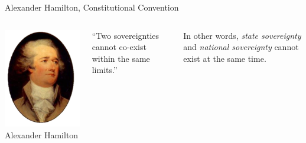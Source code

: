 \begin{frame}{Alexander Hamilton, Constitutional Convention}
    \begin{columns}[onlytextwidth]
            \centering
            \includegraphics[height=0.75\textheight]{img/hamilton.png} \\
            Alexander Hamilton \\

            \begin{block}{}
                ``Two sovereignties cannot co-exist within the same limits.''
            \end{block}
            \pause
            \vspace{15pt}
            In other words, \emph{state sovereignty} and \emph{national sovereignty} cannot exist at the same time.
    \end{columns}
\end{frame}

